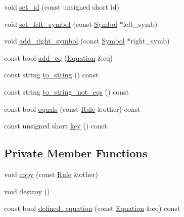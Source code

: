 \begin{CompactItemize}
\item 
void \hyperlink{classgenevalmag_1_1Rule_f1f423dd609fc03692dd44a9b421d0eb}{set\_\-id} (const unsigned short id)
\item 
void \hyperlink{classgenevalmag_1_1Rule_adb73aec92b549b69e2a46c5d0fb0c02}{set\_\-left\_\-symbol} (const \hyperlink{classgenevalmag_1_1Symbol}{Symbol} $\ast$left\_\-symb)
\item 
void \hyperlink{classgenevalmag_1_1Rule_ad3d9a79889338ef270de09fcbf91729}{add\_\-right\_\-symbol} (const \hyperlink{classgenevalmag_1_1Symbol}{Symbol} $\ast$right\_\-symb)
\item 
const bool \hyperlink{classgenevalmag_1_1Rule_55196f34d7b5a4793e089f1332d4c8b0}{add\_\-eq} (\hyperlink{classgenevalmag_1_1Equation}{Equation} \&eq)
\item 
const string \hyperlink{classgenevalmag_1_1Rule_5efc9f6c6c576c52937ece211333a743}{to\_\-string} () const 
\item 
const string \hyperlink{classgenevalmag_1_1Rule_b29cbf1ccafc2585524ee9cdbe58362b}{to\_\-string\_\-not\_\-eqs} () const 
\item 
const bool \hyperlink{classgenevalmag_1_1Rule_3e625589d6f1d8575c625a60d1dd210c}{equals} (const \hyperlink{classgenevalmag_1_1Rule}{Rule} \&other) const 
\item 
const unsigned short \hyperlink{classgenevalmag_1_1Rule_3f83cca5fc997bdc3c6404eaa57a17ca}{key} () const 
\end{CompactItemize}
\subsection*{Private Member Functions}
\begin{CompactItemize}
\item 
void \hyperlink{classgenevalmag_1_1Rule_79dbd2cb842fc959aa78e178daca89e2}{copy} (const \hyperlink{classgenevalmag_1_1Rule}{Rule} \&other)
\item 
void \hyperlink{classgenevalmag_1_1Rule_9089d3054bc30429fa27800720980df1}{destroy} ()
\item 
const bool \hyperlink{classgenevalmag_1_1Rule_17ed3eece9dc6599966b4d97a249af5a}{defined\_\-equation} (const \hyperlink{classgenevalmag_1_1Equation}{Equation} \&eq) const 
\end{CompactItemize}

